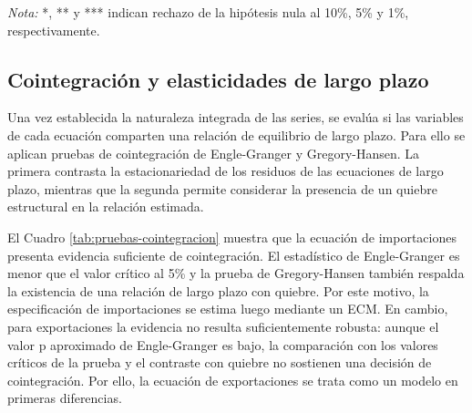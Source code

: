 \documentclass[11pt]{article}
\begin{document}
\begin{table}[H]
\centering
\caption{Diagnóstico de estacionalidad en primeras diferencias logarítmicas.}
\label{tab:diagnostico-estacionalidad}
\small
{}
\vspace{1mm}

\begin{minipage}{0.96\textwidth}
\footnotesize \textit{Nota:} *, ** y *** indican rechazo de la hipótesis nula al 10\%, 5\% y 1\%, respectivamente.
\end{minipage}
\end{table}

\subsection{Cointegración y elasticidades de largo plazo}
\label{subsec:cointegracion-elasticidades-largo-plazo}

Una vez establecida la naturaleza integrada de las series, se evalúa si las
variables de cada ecuación comparten una relación de equilibrio de largo plazo.
Para ello se aplican pruebas de cointegración de Engle-Granger y
Gregory-Hansen. La primera contrasta la estacionariedad de los residuos de las
ecuaciones de largo plazo, mientras que la segunda permite considerar la
presencia de un quiebre estructural en la relación estimada.

El Cuadro \ref{tab:pruebas-cointegracion} muestra que la ecuación de
importaciones presenta evidencia suficiente de cointegración. El estadístico de
Engle-Granger es menor que el valor crítico al 5\% y la prueba de
Gregory-Hansen también respalda la existencia de una relación de largo plazo
con quiebre. Por este motivo, la especificación de importaciones se estima
luego mediante un ECM. En cambio, para
exportaciones la evidencia no resulta suficientemente robusta: aunque el
valor p aproximado de Engle-Granger es bajo, la comparación con los valores
críticos de la prueba y el contraste con quiebre no sostienen una decisión de
cointegración. Por ello, la ecuación de exportaciones se trata como un modelo
en primeras diferencias.
\end{document}
